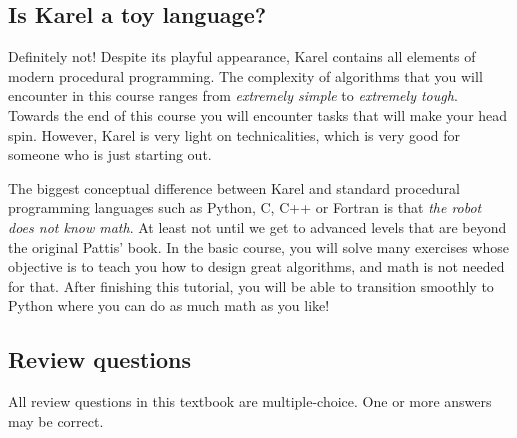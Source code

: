 \documentclass[article,A4,12pt]{llncs}
\begin{document}
\subsection{Is Karel a toy language?}

Definitely not! Despite its playful appearance, Karel contains all elements 
of modern procedural programming. The complexity of algorithms 
that you will encounter in this course ranges from {\em extremely simple} 
to {\em extremely tough}. Towards the end of this course you will encounter 
tasks that will make your head spin. However, Karel is very light on 
technicalities, which is very good for someone who is just starting out.

The biggest conceptual difference between Karel and standard procedural
programming languages such as Python, C, C++ or Fortran is that {\em the robot does not 
know math}. At least not until we get to advanced levels that are beyond 
the original Pattis' book. In the basic course, you will solve many exercises 
whose objective is to teach you how to design great algorithms, and math is 
not needed for that. After finishing this tutorial, you will be able to transition 
smoothly to Python where you can do as much math as you like!
 
\subsection{Review questions}

All review questions in this textbook are multiple-choice. One or more 
answers may be correct.
\end{document}
